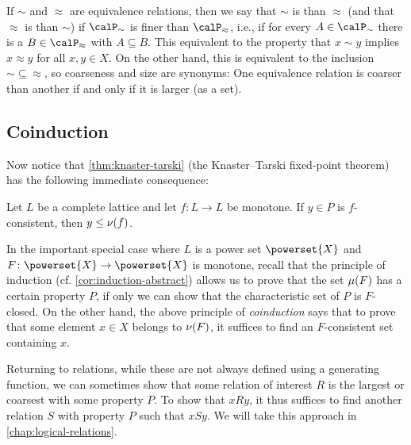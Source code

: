 %
If $\sim$ and $\approx$ are equivalence relations, then we say that $\sim$ is  than $\approx$ (and that $\approx$ is  than $\sim$) if $\calP_\sim$ is finer than $\calP_\approx$, i.e., if for every $A \in \calP_\sim$ there is a $B \in \calP_\approx$ with $A \subseteq B$. This equivalent to the property that $x \sim y$ implies $x \approx y$ for all $x,y \in X$. On the other hand, this is equivalent to the inclusion ${\sim} \subseteq {\approx}$, so coarseness and size are synonyms: One equivalence relation is coarser than another if and only if it is larger (as a set).


\subsection{Coinduction}\label{sec:coinduction}

Now notice that \cref{thm:knaster-tarski} (the Knaster--Tarski fixed-point theorem) has the following immediate consequence:

\begin{corollarynoproof}
    \label{cor:coinduction-abstract}
    Let $L$ be a complete lattice and let $f \colon L \to L$ be monotone. If $y \in P$ is $f$-consistent, then $y \leq \gfp{f}$.
\end{corollarynoproof}
%
In the important special case where $L$ is a power set $\powerset{X}$ and $F \colon \powerset{X} \to \powerset{X}$ is monotone, recall that the principle of induction (cf. \cref{cor:induction-abstract}) allows us to prove that the set $\lfp{F}$ has a certain property $P$, if only we can show that the characteristic set of $P$ is $F$-closed. On the other hand, the above principle of \emph{coinduction} says that to prove that some element $x \in X$ belongs to $\gfp{F}$, it suffices to find an $F$-consistent set containing $x$. 

Returning to relations, while these are not always defined using a generating function, we can sometimes show that some relation of interest $R$ is the largest or coarsest with some property $P$. To show that $xRy$, it thus suffices to find another relation $S$ with property $P$ such that $xSy$. We will take this approach in \cref{chap:logical-relations}.
